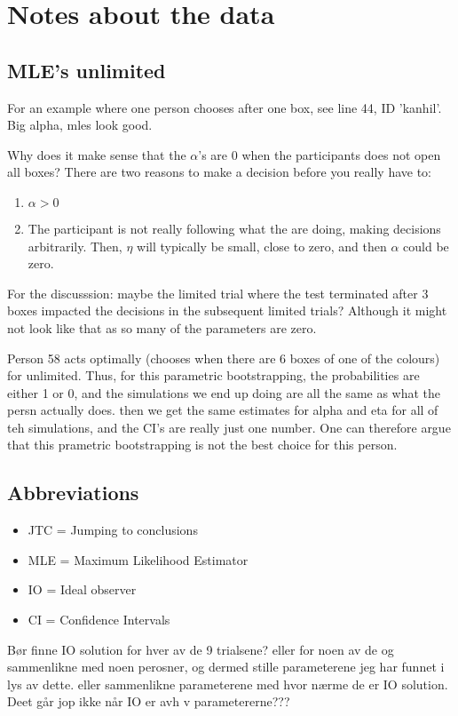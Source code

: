 \chapter{Notes about the data}

\section{MLE's unlimited}

For an example where one person chooses after one box, see line 44, ID 'kanhil'. Big alpha, mles look good. 

Why does it make sense that the $\alpha$'s are 0 when the participants does not open all boxes? There are two reasons to make a decision before you really have to:
\begin{enumerate}
    \item $\alpha > 0$ 
    \item The participant is not really following what the are doing, making decisions arbitrarily. Then, $\eta$ will typically be small, close to zero, and then $\alpha$ could be zero.
\end{enumerate}



For the discusssion: maybe the limited trial where the test terminated after 3 boxes impacted the decisions in the subsequent limited trials? Although it might not look like that as so many of the parameters are zero. 

Person 58 acts optimally (chooses when there are 6 boxes of one of the colours) for unlimited. Thus, for this parametric bootstrapping, the probabilities are either 1 or 0, and the simulations we end up doing are all the same as what the persn actually does. then we get the same estimates for alpha and eta for all of teh simulations, and the CI's are really just one number. One can therefore argue that this prametric bootstrapping is not the best choice for this person. 


\section{Abbreviations}
\begin{itemize}
    \item JTC = Jumping to conclusions
    \item MLE = Maximum Likelihood Estimator
    \item IO = Ideal observer
    \item CI = Confidence Intervals
\end{itemize}


Bør finne IO solution for hver av de 9 trialsene? eller for noen av de og sammenlikne med noen perosner, og dermed stille parameterene jeg har funnet i lys av dette. eller sammenlikne parameterene med hvor nærme de er IO solution. Deet går jop ikke når IO er avh v parametererne???